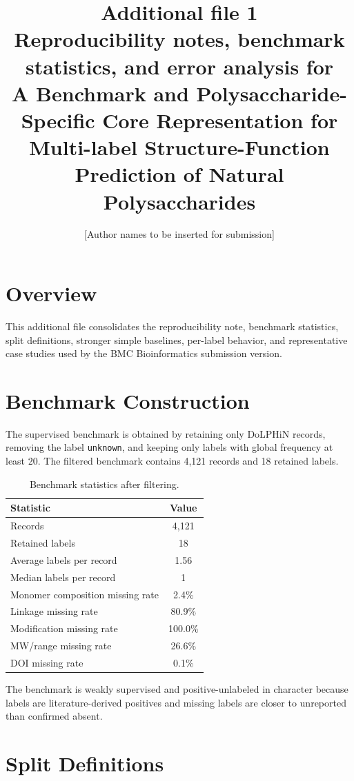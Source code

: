\documentclass{article}
\title{Additional file 1\\Reproducibility notes, benchmark statistics, and error analysis for\\A Benchmark and Polysaccharide-Specific Core Representation for Multi-label Structure-Function Prediction of Natural Polysaccharides}
\author{[Author names to be inserted for submission]}
\date{}
\begin{document}
\maketitle
\doublespacing
\linenumbers

\section{Overview}

This additional file consolidates the reproducibility note, benchmark statistics, split definitions, stronger simple baselines, per-label behavior, and representative case studies used by the BMC Bioinformatics submission version.

\section{Benchmark Construction}

The supervised benchmark is obtained by retaining only DoLPHiN records, removing the label \texttt{unknown}, and keeping only labels with global frequency at least 20. The filtered benchmark contains 4,121 records and 18 retained labels.

\begin{table}[h]
\centering
\caption{Benchmark statistics after filtering.}
\begin{tabular}{lc}
\toprule
Statistic & Value \\
\midrule
Records & 4,121 \\
Retained labels & 18 \\
Average labels per record & 1.56 \\
Median labels per record & 1 \\
Monomer composition missing rate & 2.4\% \\
Linkage missing rate & 80.9\% \\
Modification missing rate & 100.0\% \\
MW/range missing rate & 26.6\% \\
DOI missing rate & 0.1\% \\
\bottomrule
\end{tabular}
\end{table}

The benchmark is weakly supervised and positive-unlabeled in character because labels are literature-derived positives and missing labels are closer to unreported than confirmed absent.

\section{Split Definitions}
\end{document}
